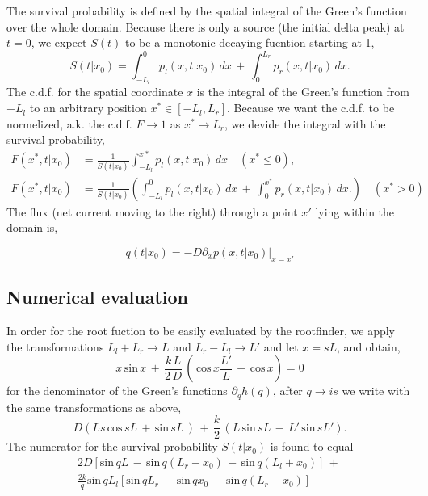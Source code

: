 The survival probability is defined by the spatial integral of the Green's function over the whole domain. Because there is only a source (the initial delta peak) at $t = 0$, we expect $S(t)$ to be a monotonic decaying fucntion starting at 1,
\begin{equation} 
 S(t|x_0) = \int_{-L_l}^{0} p_l(x,t|x_0) \, dx \, + \, \int_{0}^{L_r} p_r(x,t|x_0) \, dx.
\end{equation}
The c.d.f. for the spatial coordinate $x$ is the integral of the Green's function from $-L_l$ to an arbitrary position $x^* \in [-L_l,L_r]$. Because we want the c.d.f. to be normelized, a.k. the c.d.f. $F \rightarrow 1$ as $x^* \rightarrow L_r$, we devide the integral with the survival probability,
\begin{equation}
 \begin{split}
  F(x^*,t|x_0) & = \frac{1}{S(t|x_0)} \int_{-L_l}^{x*} p_l(x,t|x_0) \, dx \quad (x^* \leq 0), \\
  F(x^*,t|x_0) & = \frac{1}{S(t|x_0)} \left( \int_{-L_l}^{0} p_l(x,t|x_0) \, dx \, + \, \int_{0}^{x^*} p_r(x,t|x_0) \, dx. \right) \quad (x^* > 0) 
 \end{split}
\end{equation}
The flux (net current moving to the right) through a point $x'$ lying within the domain is,

\begin{equation}
 q(t|x_0) = -D \left. \partial_x p(x,t|x_0) \right|_{x = x'}
\end{equation}

\subsection{Numerical evaluation}

In order for the root fuction to be easily evaluated by the rootfinder, we apply the transformations $L_l + L_r \rightarrow L$ and $L_r - L_l \rightarrow L'$ and let $x = s L$, and obtain,
\begin{equation}
 x \, \mathrm{sin} \, x \, + \, \frac{k \, L}{2 \, D} \, \left( \, \mathrm{cos} \, x \frac{L'}{L} \, - \, \mathrm{cos} \, x \right) = 0
\end{equation}
for the denominator of the Green's functions $\partial_q h(q)$, after $q \rightarrow i s$ we write with the same transformations as above,
\begin{equation}
 D \left( L s \, \mathrm{cos} \, s L \, + \, \mathrm{sin} \, s L \, \right) \, + \, \frac{k}{2} \, \left( L \, \mathrm{sin} \, s L \, - \, L' \, \mathrm{sin} \, s L' \right).
\end{equation}
The numerator for the survival probability $S(t|x_0)$ is found to equal
\begin{multline}
2 D \left[ \mathrm{sin} \, q L \, - \, \mathrm{sin} \, q (L_r - x_0) \, - \, \mathrm{sin} \, q (L_l + x_0)  \right] \, + \, \\ 
 \frac{2 k}{q} \mathrm{sin} \, q L_l \left[ \mathrm{sin} \, q L_r \, - \, \mathrm{sin} \, q x_0 \, - \, \mathrm{sin} \, q (L_r - x_0) \right] 
\end{multline}